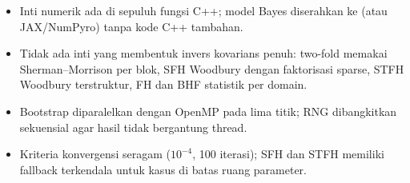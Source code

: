 \begin{itemize}
  \item Inti numerik ada di sepuluh fungsi C++; model Bayes diserahkan ke
         (atau JAX/NumPyro) tanpa kode C++ tambahan.
  \item Tidak ada inti yang membentuk invers kovarians penuh: two-fold
        memakai Sherman--Morrison per blok, SFH Woodbury dengan faktorisasi
        sparse, STFH Woodbury terstruktur, FH dan BHF statistik per domain.
  \item Bootstrap diparalelkan dengan OpenMP pada lima titik; RNG dibangkitkan
        sekuensial agar hasil tidak bergantung thread.
  \item Kriteria konvergensi seragam ($10^{-4}$, 100 iterasi); SFH dan STFH
        memiliki fallback terkendala untuk kasus di batas ruang parameter.
\end{itemize}
